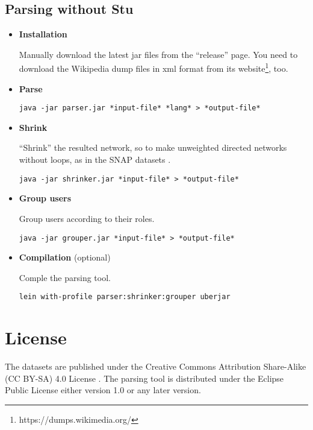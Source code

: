 \documentclass[a4paper]{article}
\begin{document}
\subsection{Parsing without Stu}
\begin{itemize}
    \item{\textbf{Installation}}

        Manually download the latest jar files from the ``release'' page. You need to download the Wikipedia dump files in xml format from its website\footnote{https://dumps.wikimedia.org/}, too.

    \item{\textbf{Parse}}

\begin{Verbatim}[commandchars=?\[\]]
    java -jar parser.jar *input-file* *lang* > *output-file*
\end{Verbatim}

    \item{\textbf{Shrink}}

    ``Shrink'' the resulted network, so to make unweighted directed networks without loops, as in the SNAP datasets \cite{leskovec2015snap}.

\begin{Verbatim}[commandchars=?\[\]]
    java -jar shrinker.jar *input-file* > *output-file*
\end{Verbatim}

    \item{\textbf{Group users}}

    Group users according to their roles.
\begin{Verbatim}[commandchars=?\[\]]
    java -jar grouper.jar *input-file* > *output-file*
\end{Verbatim}

    \item{\textbf{Compilation} (optional)}

    Comple the parsing tool.
\begin{Verbatim}[commandchars=?\[\]]
    lein with-profile parser:shrinker:grouper uberjar
\end{Verbatim}

\end{itemize}

\section{License}

The datasets are published under the Creative Commons Attribution Share-Alike (CC BY-SA) 4.0 License \cite{sun2016wikitalk}.
The parsing tool is distributed under the Eclipse Public License either version 1.0 or any later version.
\end{document}
